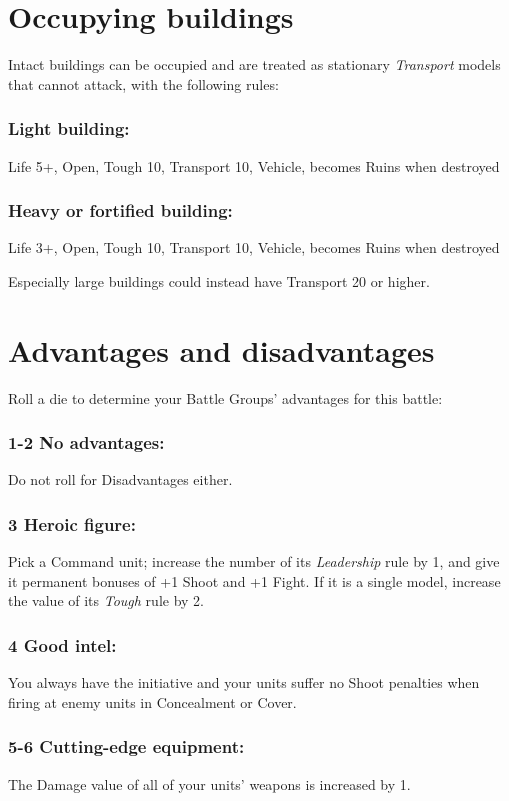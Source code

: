 \begin{multicols}{2}
\section*{Occupying buildings}
Intact buildings can be occupied and are treated as stationary \textit{Transport} models that cannot attack, with the following rules:

\subsubsection*{Light building:} Life 5+, Open, Tough 10, Transport 10, Vehicle, becomes Ruins when destroyed

\subsubsection*{Heavy or fortified building:} Life 3+, Open, Tough 10, Transport 10, Vehicle, becomes Ruins when destroyed

Especially large buildings could instead have Transport 20 or higher.




\section*{Advantages and disadvantages}
Roll a die to determine your Battle Groups' advantages for this battle:
\subsubsection*{1-2 No advantages:} Do not roll for Disadvantages either.

\subsubsection*{3 Heroic figure:} Pick a Command unit; increase the number of its \textit{Leadership} rule by 1, and give it permanent bonuses of +1 Shoot and +1 Fight. If it is a single model, increase the value of its \textit{Tough} rule by 2.

\subsubsection*{4 Good intel:} You always have the initiative and your units suffer no Shoot penalties when firing at enemy units in Concealment or Cover.

\subsubsection*{5-6 Cutting-edge equipment:} The Damage value of all of your units' weapons is increased by 1.


\end{multicols}
